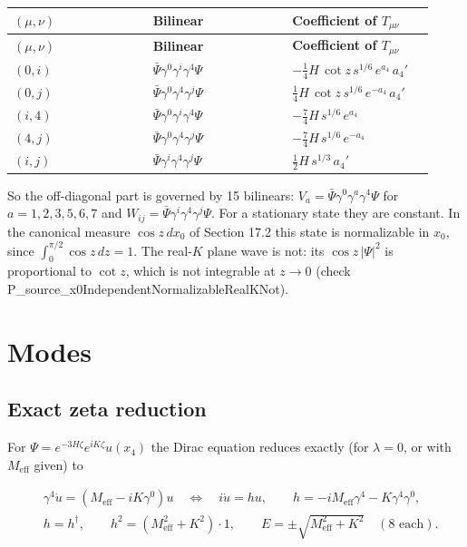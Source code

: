 \documentclass[11pt]{article}
\begin{document}
\begin{longtable}{@{}p{0.307\linewidth}p{0.307\linewidth}p{0.307\linewidth}@{}}
\toprule
\textbf{$(\mu,\nu)$} & \textbf{Bilinear} & \textbf{Coefficient of $T_{\mu\nu}$} \\
\midrule
\endfirsthead
\toprule
\textbf{$(\mu,\nu)$} & \textbf{Bilinear} & \textbf{Coefficient of $T_{\mu\nu}$} \\
\midrule
\endhead
$(0,i)$ & $\bar\Psi\gamma^{0}\gamma^{i}\gamma^{4}\Psi$ & $-\tfrac{1}{4}H\,\cot z\,s^{1/6}\,e^{a_4}\,a_4'$ \\
$(0,j)$ & $\bar\Psi\gamma^{0}\gamma^{4}\gamma^{j}\Psi$ & $\tfrac{1}{4}H\,\cot z\,s^{1/6}\,e^{-a_4}\,a_4'$ \\
$(i,4)$ & $\bar\Psi\gamma^{0}\gamma^{i}\gamma^{4}\Psi$ & $-\tfrac{7}{4}H\,s^{1/6}\,e^{a_4}$ \\
$(4,j)$ & $\bar\Psi\gamma^{0}\gamma^{4}\gamma^{j}\Psi$ & $-\tfrac{7}{4}H\,s^{1/6}\,e^{-a_4}$ \\
$(i,j)$ & $\bar\Psi\gamma^{i}\gamma^{4}\gamma^{j}\Psi$ & $\tfrac{1}{2}H\,s^{1/3}\,a_4'$ \\
\bottomrule
\end{longtable}

So the off-diagonal part is governed by 15 bilinears: $V_a=\bar\Psi\gamma^0\gamma^a\gamma^4\Psi$ for $a=1,2,3,5,6,7$ and $W_{ij}=\bar\Psi\gamma^i\gamma^4\gamma^j\Psi$. For a stationary state they are constant. In the canonical measure $\cos z\,dx_0$ of Section 17.2 this state is normalizable in $x_0$, since $\int_0^{\pi/2}\cos z\,dz=1$. The real-$K$ plane wave is not: its $\cos z\,|\Psi|^2$ is proportional to $\cot z$, which is not integrable at $z\to0$ (check P\_source\_x0IndependentNormalizableRealKNot).

\section{Modes}

\subsection{Exact zeta reduction}

For $\Psi=e^{-3H\zeta}e^{iK\zeta}u(x_4)$ the Dirac equation reduces exactly (for $\lambda=0$, or with $M_{\mathrm{eff}}$ given) to

\[
\begin{aligned}
&\gamma^4\dot u=(M_{\mathrm{eff}}-iK\gamma^0)u\quad\Longleftrightarrow\quad i\dot u=hu,\qquad h=-iM_{\mathrm{eff}}\gamma^4-K\gamma^4\gamma^0, \\
&h=h^\dagger,\qquad h^2=(M_{\mathrm{eff}}^2+K^2)\cdot1,\qquad E=\pm\sqrt{M_{\mathrm{eff}}^2+K^2}\quad(8\text{ each}).
\end{aligned}
\]
\end{document}
